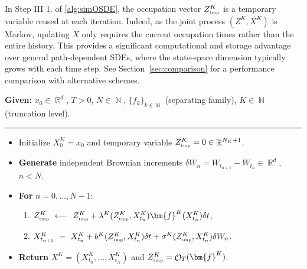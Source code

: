 \documentclass[11pt]{article}
\numberwithin{equation}{section}
\theoremstyle{plain}
\theoremstyle{definition}
\DeclareMathOperator{\N}{\mathbb{N}}
\DeclareMathOperator{\R}{\mathbb{R}}
\DeclareMathOperator{\calO}{\mathcal{O}}
\begin{document}
In Step III 1. of \cref{alg:simOSDE}, the occupation vector $Z^K_{\text{\tiny tmp}}$ is a temporary variable reused at each iteration. Indeed, as the joint process  $(Z^K,X^K)$ is Markov, updating $X$ only requires the current occupation times rather than the entire history. This provides a significant computational and storage advantage over general path-dependent SDEs, where the state-space dimension typically grows with each time step.  See Section~\ref{sec:comparison} for a performance comparison with alternative schemes. 

\begin{algorithm}[H]
\caption{\textbf{Euler-Maruyama Scheme,  Projected OSDEs (one sample)} }\label{alg:simOSDE}

\vspace{1mm}
 \textbf{Given:} $x_0\in \R^d$, $T>0$, $N \in \N$,    $\{f_k\}_{k\in \N}$ (separating family), $K \in \N$ (truncation level). 
 \\[-0.5em] 
\noindent\rule{\textwidth}{0.5pt} 
\begin{itemize}
 \setlength \itemsep{0.5em}

\item[I.] Initialize $X_0^K = x_0$ and  temporary variable $Z^K_{\text{\tiny tmp}} = 0\in \R^{N_K+1}$. 

\item[II.] \textbf{Generate} independent Brownian increments $\delta W_n = W_{t_{n+1}} - W_{t_{n}} \in \R^d$, $n<N$. 

\item[III.] \textbf{For} $n=0,\ldots,N-1$:  
\begin{enumerate}
 \setlength \itemsep{1.25em}
     \item 
     $ Z^K_{\text{\tiny tmp}} \ \longleftarrow \ Z^K_{\text{\tiny tmp}} + \lambda^K( Z^K_{\text{\tiny tmp}},X_{t_n}^{K}) \bm{f}^K(X_{t_n}^{K}) \delta t$,
     
     \item 
$X_{t_{n+1}}^{K} \ = \  X_{t_{n}}^{K}  + b^K(Z^K_{\text{\tiny tmp}},X_{t_{n}}^{K}) \delta t + 
    \sigma^K(Z^K_{\text{\tiny tmp}},X_{t_{n}}^K)\delta W_{n}$.

 \end{enumerate}

 \item[IV.] \textbf{Return} $X^K = (X_{t_0}^K, \ldots, X_{t_N}^K)$ and $Z^K_{\text{\tiny tmp}} = \calO_T(\bm{f}^K)$. 
   \end{itemize}
\end{algorithm}
\end{document}
